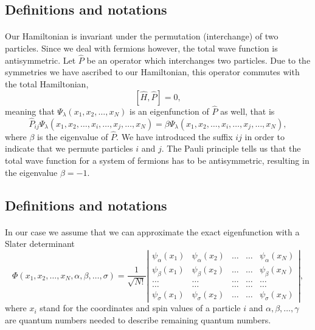 \documentclass[%
twoside,                 %
final,                   %
10pt]{article}
\begin{document}
\subsection{Definitions and notations}

\paragraph{}
Our Hamiltonian is invariant under the permutation (interchange) of two particles. %
Since we deal with fermions however, the total wave function is antisymmetric.
Let $\hat{P}$ be an operator which interchanges two particles.
Due to the symmetries we have ascribed to our Hamiltonian, this operator commutes with the total Hamiltonian,
\[
[\hat{H},\hat{P}] = 0,
 \]
meaning that $\Psi_{\lambda}(x_1, x_2, \dots , x_N)$ is an eigenfunction of 
$\hat{P}$ as well, that is
\[
\hat{P}_{ij}\Psi_{\lambda}(x_1, x_2, \dots,x_i,\dots,x_j,\dots,x_N)=
\beta\Psi_{\lambda}(x_1, x_2, \dots,x_i,\dots,x_j,\dots,x_N),
\]
where $\beta$ is the eigenvalue of $\hat{P}$. We have introduced the suffix $ij$ in order to indicate that we permute particles $i$ and $j$.
The Pauli principle tells us that the total wave function for a system of fermions
has to be antisymmetric, resulting in the eigenvalue $\beta = -1$.



\subsection{Definitions and notations}

\paragraph{}
In our case we assume that  we can approximate the exact eigenfunction with a Slater determinant
\begin{equation}
   \Phi(x_1, x_2,\dots ,x_N,\alpha,\beta,\dots, \sigma)=\frac{1}{\sqrt{N!}}
\left| \begin{array}{ccccc} \psi_{\alpha}(x_1)& \psi_{\alpha}(x_2)& \dots & \dots & \psi_{\alpha}(x_N)\\
                            \psi_{\beta}(x_1)&\psi_{\beta}(x_2)& \dots & \dots & \psi_{\beta}(x_N)\\  
                            \dots & \dots & \dots & \dots & \dots \\
                            \dots & \dots & \dots & \dots & \dots \\
                     \psi_{\sigma}(x_1)&\psi_{\sigma}(x_2)& \dots & \dots & \psi_{\sigma}(x_N)\end{array} \right|, \label{eq:HartreeFockDet}
\end{equation}
where  $x_i$  stand for the coordinates and spin values of a particle $i$ and $\alpha,\beta,\dots, \gamma$ 
are quantum numbers needed to describe remaining quantum numbers.
\end{document}

